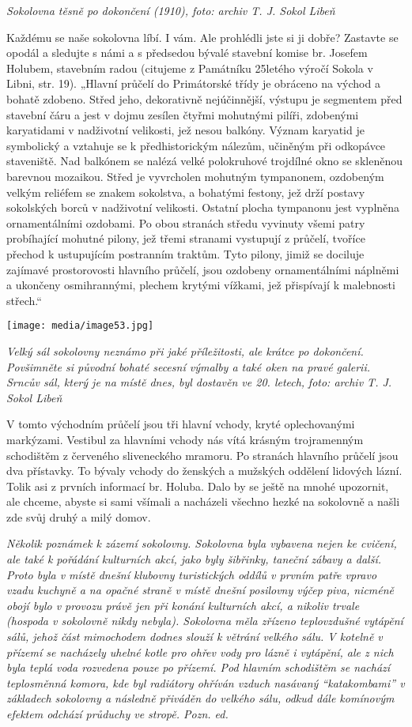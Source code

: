 \emph{Sokolovna těsně po dokončení (1910), foto: archiv T. J. Sokol
Libeň}

Každému se naše sokolovna líbí. I vám. Ale prohlédli jste si ji dobře?
Zastavte se opodál a sledujte s námi a s předsedou bývalé stavební
komise br. Josefem Holubem, stavebním radou (citujeme z Památníku
25letého výročí Sokola v Libni, str. 19). „Hlavní průčelí do Primátorské
třídy je obráceno na východ a bohatě zdobeno. Střed jeho, dekorativně
nejúčinnější, výstupu je segmentem před stavební čáru a jest v dojmu
zesílen čtyřmi mohutnými pilíři, zdobenými karyatidami v nadživotní
velikosti, jež nesou balkóny. Význam karyatid je symbolický a vztahuje
se k předhistorickým nálezům, učiněným při odkopávce staveniště. Nad
balkónem se nalézá velké polokruhové trojdílné okno se skleněnou
barevnou mozaikou. Střed je vyvrcholen mohutným tympanonem, ozdobeným
velkým reliéfem se znakem sokolstva, a bohatými festony, jež drží
postavy sokolských borců v nadživotní velikosti. Ostatní plocha
tympanonu jest vyplněna ornamentálními ozdobami. Po obou stranách středu
vyvinuty všemi patry probíhající mohutné pilony, jež třemi stranami
vystupují z průčelí, tvoříce přechod k ustupujícím postranním traktům.
Tyto pilony, jimiž se dociluje zajímavé prostorovosti hlavního průčelí,
jsou ozdobeny ornamentálními náplněmi a ukončeny osmihrannými, plechem
krytými vížkami, jež přispívají k malebnosti střech.``

\texttt{[image: media/image53.jpg]}

\emph{Velký sál sokolovny neznámo při jaké příležitosti, ale krátce po
dokončení. Povšimněte si původní bohaté secesní výmalby a také oken na
pravé galerii. Srncův sál, který je na místě dnes, byl dostavěn ve 20.
letech,} \emph{foto: archiv T. J. Sokol Libeň}

V tomto východním průčelí jsou tři hlavní vchody, kryté oplechovanými
markýzami. Vestibul za hlavními vchody nás vítá krásným trojramenným
schodištěm z červeného sliveneckého mramoru. Po stranách hlavního
průčelí jsou dva přístavky. To bývaly vchody do ženských a mužských
oddělení lidových lázní. Tolik asi z prvních informací br. Holuba. Dalo
by se ještě na mnohé upozornit, ale chceme, abyste si sami všímali a
nacházeli všechno hezké na sokolovně a našli zde svůj druhý a milý
domov.

\emph{Několik poznámek k zázemí sokolovny. Sokolovna byla vybavena nejen
ke cvičení, ale také k pořádání kulturních akcí, jako byly šibřinky,
taneční zábavy a další. Proto byla v místě dnešní klubovny turistických
oddílů v prvním patře vpravo vzadu kuchyně a na opačné straně v místě
dnešní posilovny výčep piva, nicméně obojí bylo v provozu právě jen při
konání kulturních akcí, a nikoliv trvale (hospoda v sokolovně nikdy
nebyla). Sokolovna měla zřízeno teplovzdušné vytápění sálů, jehož část
mimochodem dodnes slouží k větrání velkého sálu. V kotelně v přízemí se
nacházely uhelné kotle pro ohřev vody pro lázně i vytápění, ale z nich
byla teplá voda rozvedena pouze po přízemí. Pod hlavním schodištěm se
nachází teplosměnná komora, kde byl radiátory ohříván vzduch nasávaný
``katakombami'' v základech sokolovny a následně přiváděn do velkého
sálu, odkud dále komínovým efektem odchází průduchy ve stropě. Pozn.
ed.}

